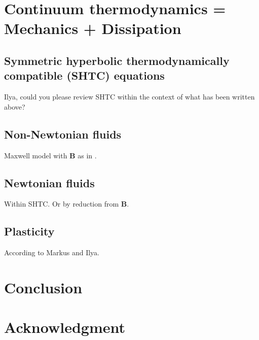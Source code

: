 \documentclass[
10pt, %
a4paper, %
oneside, %
headinclude,footinclude, %
BCOR5mm, %
]{scrartcl}
\newcommand{\BB}{\mathbf{B}}
\begin{document}
\section{Continuum thermodynamics = Mechanics + Dissipation}

\subsection{Symmetric hyperbolic thermodynamically compatible (SHTC) equations}
Ilya, could you please review SHTC within the context of what has been written above?

\subsection{Non-Newtonian fluids}
Maxwell model with $\BB$ as in \cite{PKG}.

\subsection{Newtonian fluids}
Within SHTC. Or by reduction from $\BB$.

\subsection{Plasticity}\label{sec.plasticity}
According to Markus and Ilya. 

\section{Conclusion}

\section*{Acknowledgment}


\renewcommand{\refname}{\spacedlowsmallcaps{References}} %





\appendix
\end{document}

